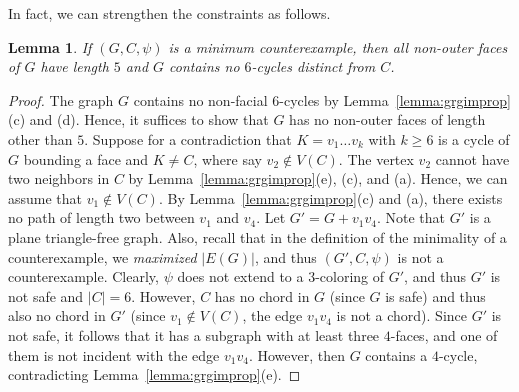 \documentclass[12pt,twoside,openright,a4paper]{book}
\newtheorem{lemma}[theorem]{Lemma}
\begin{document}
In fact, we can strengthen the constraints as follows.
\begin{lemma}\label{lemma:grgimprop1}
If $(G,C,\psi)$ is a minimum counterexample, then all non-outer faces of $G$ have length $5$ and $G$ contains no $6$-cycles distinct
from $C$.
\end{lemma}
\begin{proof}
The graph $G$ contains no non-facial $6$-cycles by Lemma~\ref{lemma:grgimprop}(c) and (d).
Hence, it suffices to show that $G$ has no non-outer faces of length other than $5$.
Suppose for a contradiction that $K=v_1\ldots v_k$ with $k\ge 6$ is a cycle of $G$ bounding a face and $K\neq C$,
where say $v_2\not\in V(C)$.  The vertex $v_2$ cannot have two neighbors in $C$ by Lemma~\ref{lemma:grgimprop}(e), (c), and (a).
Hence, we can assume that $v_1\not\in V(C)$.  By Lemma~\ref{lemma:grgimprop}(c) and (a), there exists no path of length two between
$v_1$ and $v_4$.  Let $G'=G+v_1v_4$.  Note that $G'$ is a plane triangle-free graph.  Also, recall that in the definition
of the minimality of a counterexample, we \emph{maximized} $|E(G)|$, and thus $(G',C,\psi)$ is not a counterexample.
Clearly, $\psi$ does not extend to a $3$-coloring of $G'$, and thus $G'$ is not safe and $|C|=6$.  However, $C$ has no chord
in $G$ (since $G$ is safe) and thus also no chord in $G'$ (since $v_1\not\in V(C)$, the edge $v_1v_4$ is not a chord).
Since $G'$ is not safe, it follows that it has a subgraph with at least three $4$-faces, and one of them is not incident with
the edge $v_1v_4$.  However, then $G$ contains a $4$-cycle, contradicting Lemma~\ref{lemma:grgimprop}(e).
\end{proof}
\end{document}

